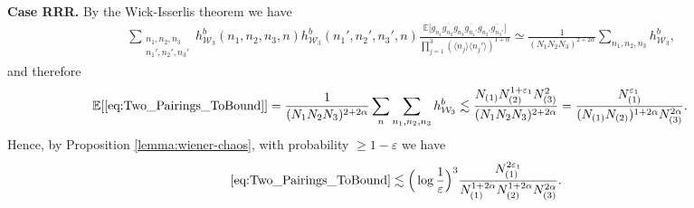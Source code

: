 \documentclass[11pt, xcolor = dvipsnames,reqno
]{amsart}
\theoremstyle{definition}
\theoremstyle{remark}
\begin{document}
    \noindent
    \textbf{Case RRR.} 
    By the Wick-Isserlis theorem we have 
        \begin{align}
            & \sum_{\substack{n_1,n_2,n_3 \\ n_1', n_2', n_3' }} h^b_{\mathcal{W}_3}(n_1,n_2,n_3,n) h^b_{\mathcal{W}_3}(n_1',n_2',n_3',n) 
            \frac{ \mathbb E\big[ g_{n_1} \overline{g_{n_2}} g_{n_3} \overline{g_{n_1'} } g_{n_2'} \overline{g_{n_3'}} \big]}{ \prod_{j=1}^3 (\langle n_j \rangle \langle n_j' \rangle )^{1+\alpha}} 
            \simeq \frac{1}{(N_1N_2N_3)^{2+2\alpha}} \sum_{n_1,n_2,n_3} h^b_{\mathcal{W}_3}, 
        \end{align}
    and therefore 
    \begin{align}
            \mathbb E [\eqref{eq:Two_Pairings_ToBound}]
            & = \frac{1}{(N_1N_2N_3)^{2+2\alpha}} \sum_n \sum_{n_1,n_2,n_3} h^b_{\mathcal{W}_3} 
            \lesssim  \frac{N_{(1)}N_{(2)}^{1+\varepsilon_1} N_{(3)}^2}{(N_1N_2N_3)^{2+2\alpha}} = \frac{N_{(1)}^{\varepsilon_1}}{(N_{(1)}N_{(2)})^{1+2\alpha}N_{(3)}^{2\alpha}}. 
    \end{align}
    Hence, by Proposition \ref{lemma:wiener-chaos}, with probability $\geq 1-\varepsilon$ we have 
    \begin{align}\label{eq:wiener-app2}
        \eqref{eq:Two_Pairings_ToBound} 
        \lesssim \Big(\log \frac{1}{\varepsilon} \Big)^3 \frac{N_{(1)}^{2\varepsilon_1}}{N_{(1)}^{1+2\alpha}N_{(2)}^{1+2\alpha}N_{(3)}^{2\alpha}}.
    \end{align}
\end{document}
